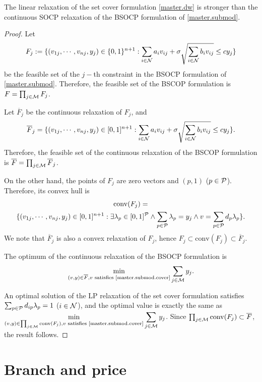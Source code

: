 \begin{proposition}
\label{prop.strong}
The linear relaxation of the set cover formulation \eqref{master.dw} is stronger than the continuous SOCP relaxation of the BSOCP formulation of \eqref{master.submod}.
\end{proposition}
 \begin{proof}
 Let $$F_j := \{(v_{1j},\cdots,v_{nj}, y_j) \in \{0,1\}^{n+1} : \sum_{i \in \mathcal N} a_i v_{ij} + \sigma\sqrt{\sum_{i \in \mathcal N} b_i v_{ij} } \le c  {y}_{{j}}\}$$ be the feasible set of the $j-$th constraint in the BSOCP formulation of \eqref{master.submod}.  Therefore, the feasible set of the BSCOP formulation is $F = \prod_{j \in \mathcal M} F_j$.
 
Let $\overline{F}_j$  be the continuous relaxation of $F_j$, and
$$\overline{F}_j = \{(v_{1j},\cdots,v_{nj}, y_j) \in [0,1]^{n+1}: \sum_{i \in \mathcal N} a_i v_{ij} + \sigma\sqrt{\sum_{i \in \mathcal N} b_i v_{ij} } \le c  {y}_{{j}}\}.$$ Therefore, the feasible set of the continuous relaxation of the BSCOP formulation is $\overline{F}=\prod_{j \in \mathcal M} \overline{F}_j$.

 On the other hand, the points of $F_j$ are zero vectors and $(p,1)$ ($p \in \mathcal P$). Therefore, its convex hull is
 \begin{multline*}
	 \mathrm{conv}(F_j) = \\
	 \{(v_{1j},\cdots,v_{nj},y_j)  \in [0,1]^{n+1}: \exists \lambda_p \in [0,1]^{\mathcal P} \land \sum_{p \in \mathcal P} \lambda_p = y_j \land v =  \sum_{p \in \mathcal P} d_p \lambda_p \}.
 \end{multline*}
 We note that $\overline{F}_j$ is also a convex relaxation of $F_j$, hence $F_j  \subset \mathrm{conv}(F_j) \subset \overline{F}_j$.

 The optimum of the continuous relaxation of the BSOCP formulation is \[\displaystyle \min_{(v,y) \in \overline{F}, v \textup{ satisfies \eqref{master.submod.cover}}} \sum_{j \in \mathcal M} y_j.\]
 
  An optimal solution of the LP relaxation of the set cover formulation satisfies $\sum_{p \in \mathcal P} d_{ip} \lambda_p = 1$ ($ i \in \mathcal N$), and the optimal value is exactly the same as $\displaystyle \min_{(v,y) \in \prod_{j \in \mathcal M} \mathrm{conv}(F_j), v \textup{ satisfies \eqref{master.submod.cover}}} \sum_{j \in \mathcal M} y_j$. Since $\prod_{j \in \mathcal M} \mathrm{conv}(F_j) \subset \overline{F}$, the result follows.
   \end{proof}



\section{Branch and price}

